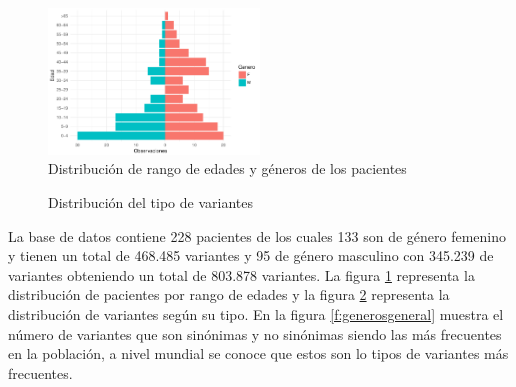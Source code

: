 \begin{figure}[h!]
	\centering
	\includegraphics[width=0.5\textwidth]{Kap4/general}
	\caption{Distribución de rango de edades y géneros de los pacientes}
	\label{fig:general}
\end{figure}

\begin{figure}[H]
	\centering
	\caption{Distribución del tipo de variantes}
	\label{f:variantesgeneral}
\end{figure}

La base de datos contiene 228 pacientes de los cuales 133 son de género femenino y tienen un total de 468.485 variantes y 95 de género masculino con 345.239 de variantes obteniendo  un total de 803.878 variantes. La  figura \ref{fig:general} representa la distribución de pacientes por rango de edades y la figura \ref{f:variantesgeneral} representa la distribución de variantes según su tipo. En la figura \ref{f:generosgeneral} muestra el número de variantes que son sinónimas y no sinónimas siendo las más frecuentes en la población, a  nivel mundial se conoce que estos son lo tipos de variantes más frecuentes\cite{Fu2013}.\\

